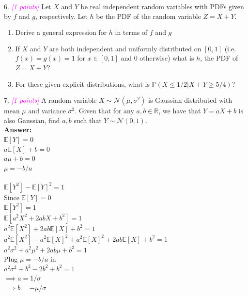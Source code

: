 \documentclass{article}
\newcommand{\field}[1]{\mathbb{#1}}
\newcommand{\1}{\mathbf{1}}
\renewcommand{\P}{\mathbb{P}}
\newcommand{\R}{\field{R}} %
\newcommand{\ProbOpr}[1]{\mathbb{#1}}
\newcommand{\grade}[1]{\small\textcolor{magenta}{\emph{[#1 points]}} \normalsize}
\begin{document}
6. \grade{1} Let $X$ and $Y$ be real independent random variables with PDFs given by $f$ and $g$, respectively. Let $h$ be the PDF of the random variable $Z = X+Y$.
\begin{enumerate}
	\item Derive a general expression for $h$ in terms of $f$ and $g$
	\item If $X$ and $Y$ are both independent and uniformly distributed on $[0,1]$ (i.e. $f(x)=g(x)=1$ for $x \in [0,1]$ and $0$ otherwise) what is $h$, the PDF of $Z=X+Y$?
	\item For these given explicit distributions, what is $\P(X \leq 1/2 | X+Y\geq 5/4)$?
\end{enumerate}

7. \grade{1} A random variable $X \sim \mathcal{N}(\mu, \sigma^2)$ is Gaussian distributed with mean $\mu$ and variance $\sigma^2$. Given that for any $a,b \in \R$, we have that $Y = aX + b$ is also Gaussian, find $a,b$ such that $Y \sim \mathcal{N}(0,1)$.\\
\textbf{Answer:}\\
$\ProbOpr{E}[Y]=0$\\
$a \ProbOpr{E}[X]+b=0$\\
$a\mu+b=0$\\
$\mu=-b/a$\\
\\
$\ProbOpr{E}[Y^2]-\ProbOpr{E}[Y]^2=1$\\
Since $\ProbOpr{E}[Y]=0$\\
$\ProbOpr{E}[Y^2]=1$\\
$\ProbOpr{E}[a^2 X^2+2abX+b^2]=1$\\
$a^2 \ProbOpr{E}[X^2]+2ab\ProbOpr{E}[X]+b^2=1$\\
$a^2 \ProbOpr{E}[X^2]-a^2\ProbOpr{E}[X]^2+a^2\ProbOpr{E}[X]^2+2ab\ProbOpr{E}[X]+b^2=1$\\
$a^2 \sigma^2+a^2\mu^2+2ab\mu+b^2=1$\\
Plug $\mu=-b/a$ in\\
$a^2 \sigma^2+b^2-2b^2+b^2=1$\\
$\implies a=1/\sigma$\\
$\implies b=-\mu/\sigma$\\
\end{document}

